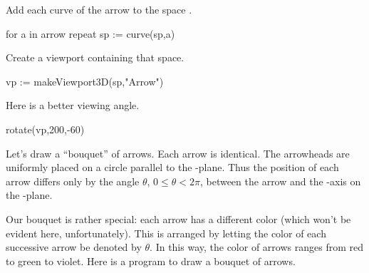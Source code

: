 \begin{xtc}
\begin{xtccomment}
Add each curve of the arrow to the space .
\end{xtccomment}
\begin{spadsrc}
for a in arrow repeat sp := curve(sp,a)
\end{spadsrc}
\end{xtc}
\begin{psXtc}
\begin{xtccomment}
Create a \threedim{} viewport containing that space.
\end{xtccomment}
\begin{spadsrc}
vp := makeViewport3D(sp,"Arrow")
\end{spadsrc}
\end{psXtc}
\begin{psXtc}
\begin{xtccomment}
Here is a better viewing angle.
\end{xtccomment}
\begin{spadsrc}
rotate(vp,200,-60)
\end{spadsrc}
\end{psXtc}




Let's draw a ``bouquet'' of arrows.
Each arrow is identical. The arrowheads are
uniformly placed on a circle parallel to the -plane.
Thus the position of each arrow differs only
by the angle $\theta$,
$0 \leq \theta < 2\pi$,
between the arrow and
the -axis on the -plane.

Our bouquet is rather special: each arrow has a different
color (which won't be evident here, unfortunately).
This is arranged by letting the color of each successive arrow be
denoted by $\theta$.
In this way, the color of arrows ranges from red to green to violet.
Here is a program to draw a bouquet of  arrows.

